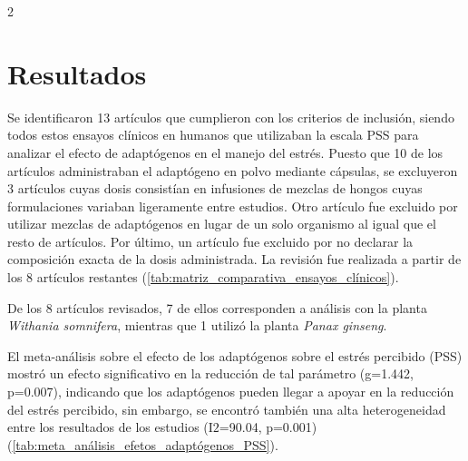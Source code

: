 \begin{multicols}{2}
\section{Resultados}

Se identificaron 13 artículos que cumplieron con los criterios de inclusión, siendo todos estos ensayos clínicos en humanos que utilizaban la escala PSS para analizar el efecto de adaptógenos en el manejo del estrés. Puesto que 10 de los artículos administraban el adaptógeno en polvo mediante cápsulas, se excluyeron 3 artículos cuyas dosis consistían en infusiones de mezclas de hongos cuyas formulaciones variaban ligeramente entre estudios. Otro artículo fue excluido por utilizar mezclas de adaptógenos en lugar de un solo organismo al igual que el resto de artículos. Por último, un artículo fue excluido por no declarar la composición exacta de la dosis administrada. La revisión fue realizada a partir de los 8 artículos restantes (\autoref{tab:matriz_comparativa_ensayos_clínicos}).

De los 8 artículos revisados, 7 de ellos corresponden a análisis con la planta \textit{Withania somnifera}, mientras que 1 utilizó la planta \textit{Panax ginseng}.

El meta-análisis sobre el efecto de los adaptógenos sobre el estrés percibido (PSS) mostró un efecto significativo en la reducción de tal parámetro (g=1.442, p=0.007), indicando que los adaptógenos pueden llegar a apoyar en la reducción del estrés percibido, sin embargo, se encontró también una alta heterogeneidad entre los resultados de los estudios (I$ {2}$=90.04, p=0.001) (\autoref{tab:meta_análisis_efetos_adaptógenos_PSS}).

\end{multicols}

    

